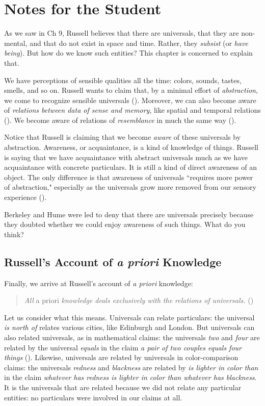 \documentclass[oneside,letterpaper,12pt]{book}
\begin{document}
\protect\hypertarget{link2HCH0011}{}{}

\pagebreak
\section{Notes for the Student}
As we saw in Ch 9, Russell believes that there are universals, that they are non-mental, and that do not exist in space and time. Rather, they \textit{subsist} (or \textit{have being}). But how do we know such entities? This chapter is concerned to explain that.

We have perceptions of sensible qualities all the time: colors, sounds, tastes, smells, and so on. Russell wants to claim that, by a minimal effort of \textit{abstraction}, we come to recognize sensible universals (\pageref{sensible}). Moreover, we can also become aware of \textit{relations between data of sense and memory}, like spatial and temporal relations (\pageref{spacetime}). We become aware of relations of \textit{resemblance} in much the same way (\pageref{resemblance}). 

Notice that Russell is claiming that we become \textit{aware} of these universals by abstraction. Awareness, or acquaintance, is a kind of knowledge of things. Russell is saying that we have acquaintance with abstract universals much as we have acquaintance with concrete particulars. It is still a kind of direct awareness of an object. The only difference is that awareness of universals ``requires more power of abstraction," especially as the universals grow more removed from our sensory experience (\pageref{abstraction}). 

Berkeley and Hume were led to deny that there are universals precisely because they doubted whether we could enjoy awareness of such things. What do you think?
\subsection*{Russell's Account of \textit{a priori} Knowledge}
Finally, we arrive at Russell's account of \textit{a priori} knowledge:
\begin{quote}
	\textit{All} a priori \textit{knowledge deals exclusively with the relations of universals.} (\pageref{apriori})
\end{quote}
Let us consider what this means. Universals can relate particulars: the universal \textit{is north of} relates various cities, like Edinburgh and London. But universals can also related universals, as in mathematical claims: the universals \textit{two} and \textit{four} are related by the universal \textit{equals} in the claim \textit{a pair of two couples equals four things} (\pageref{couples}). Likewise, universals are related by universals in color-comparison claims: the universals \textit{redness} and \textit{blackness} are related by \textit{is lighter in color than} in the claim \textit{whatever has redness is lighter in color than whatever has blackness}. It is the universals that are related because we did not relate any particular entities: no particulars were involved in our claims at all. 
\end{document}
